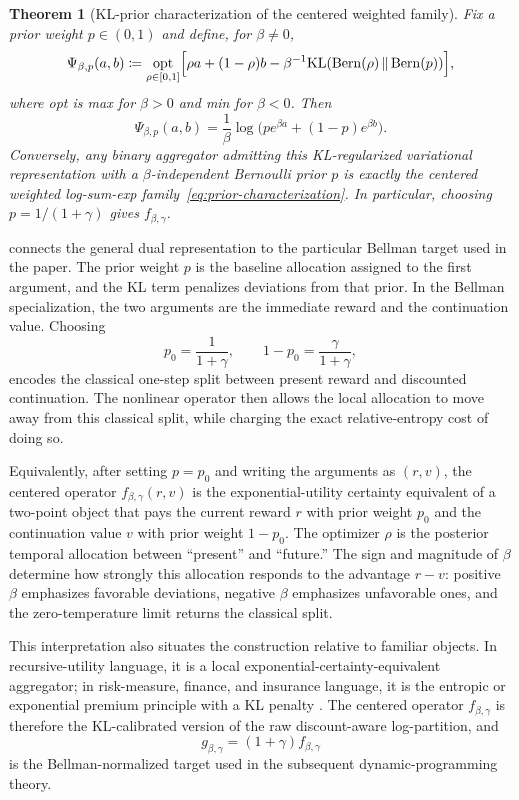 \documentclass{article}
\newtheorem{theorem}{Theorem}[section]
\theoremstyle{remark}
\DeclareMathOperator{\Bern}{Bern}
\newcommand{\KL}{\mathrm{KL}}
\newcommand{\defeq}{\coloneqq}
\newcommand{\KLbin}[2]{\KL\!\left(\Bern(#1)\,\middle\|\,\Bern(#2)\right)}
\begin{document}
\begin{theorem}[KL-prior characterization of the centered weighted family]
\label{thm:prior-characterization}
Fix a prior weight $p\in(0,1)$ and define, for $\beta\neq 0$,
\[
\Psi_{\beta,p}(a,b)
\defeq
\underset{\rho\in[0,1]}{\mathrm{opt}}
\Bigl[\rho a +(1-\rho)b - \beta^{-1}\KLbin{\rho}{p}\Bigr],
\]
where \textnormal{opt} is \textnormal{max} for $\beta>0$ and \textnormal{min} for $\beta<0$.
Then
\begin{equation}
\Psi_{\beta,p}(a,b)=\frac{1}{\beta}\log\bigl(p e^{\beta a}+(1-p)e^{\beta b}\bigr).
\label{eq:prior-characterization}
\end{equation}
Conversely, any binary aggregator admitting this KL-regularized variational representation with a
$\beta$-independent Bernoulli prior $p$ is exactly the centered weighted log-sum-exp
family~\eqref{eq:prior-characterization}. In particular, choosing $p=1/(1+\gamma)$ gives
$f_{\beta,\gamma}$.
\end{theorem}

 connects the general dual representation to the particular Bellman
target used in the paper. The prior weight $p$ is the baseline allocation assigned to the first argument,
and the KL term penalizes deviations from that prior. In the Bellman specialization, the two arguments
are the immediate reward and the continuation value. Choosing
\[
p_0=\frac{1}{1+\gamma},
\qquad
1-p_0=\frac{\gamma}{1+\gamma},
\]
encodes the classical one-step split between present reward and discounted continuation. The nonlinear
operator then allows the local allocation to move away from this classical split, while charging the
exact relative-entropy cost of doing so.

Equivalently, after setting $p=p_0$ and writing the arguments as $(r,v)$, the centered operator
$f_{\beta,\gamma}(r,v)$ is the exponential-utility certainty equivalent of a two-point object that pays
the current reward $r$ with prior weight $p_0$ and the continuation value $v$ with prior weight
$1-p_0$. The optimizer $\rho$ is the posterior temporal allocation between ``present'' and ``future.''
The sign and magnitude of $\beta$ determine how strongly this allocation responds to the advantage
$r-v$: positive $\beta$ emphasizes favorable deviations, negative $\beta$ emphasizes unfavorable
ones, and the zero-temperature limit returns the classical split.

This interpretation also situates the construction relative to familiar objects. In recursive-utility
language, it is a local exponential-certainty-equivalent aggregator; in risk-measure, finance, and
insurance language, it is the entropic or exponential premium principle with a KL penalty
\citep{kreps1978temporal,epstein1989substitution,follmer2016stochastic,denuit1999exponential}.
The centered operator $f_{\beta,\gamma}$ is therefore the KL-calibrated version of the raw
discount-aware log-partition, and
\[
g_{\beta,\gamma}=(1+\gamma)f_{\beta,\gamma}
\]
is the Bellman-normalized target used in the subsequent dynamic-programming theory.
\end{document}
